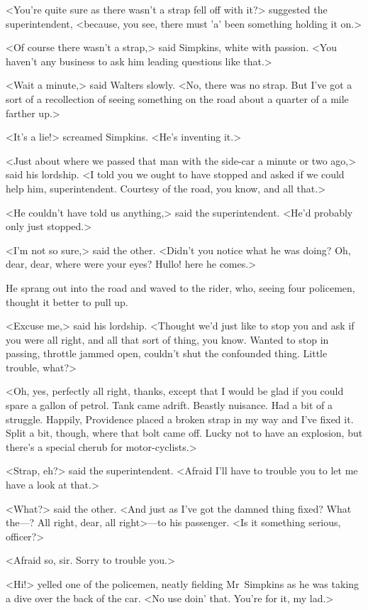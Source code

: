 <You're quite sure as there wasn't a strap fell off with it?> suggested the superintendent, <because, you see, there must 'a' been something holding it on.>

<Of course there wasn't a strap,> said Simpkins, white with passion. <You haven't any business to ask him leading questions like that.>

<Wait a minute,> said Walters slowly. <No, there was no strap. But I've got a sort of a recollection of seeing something on the road about a quarter of a mile farther up.>

<It's a lie!> screamed Simpkins. <He's inventing it.>

<Just about where we passed that man with the side-car a minute or two ago,> said his lordship. <I told you we ought to have stopped and asked if we could help him, superintendent. Courtesy of the road, you know, and all that.>

<He couldn't have told us anything,> said the superintendent. <He'd probably only just stopped.>

<I'm not so sure,> said the other. <Didn't you notice what he was doing? Oh, dear, dear, where were your eyes? Hullo! here he comes.>

He sprang out into the road and waved to the rider, who, seeing four policemen, thought it better to pull up.

<Excuse me,> said his lordship. <Thought we'd just like to stop you and ask if you were all right, and all that sort of thing, you know. Wanted to stop in passing, throttle jammed open, couldn't shut the confounded thing. Little trouble, what?>

<Oh, yes, perfectly all right, thanks, except that I would be glad if you could spare a gallon of petrol. Tank came adrift. Beastly nuisance. Had a bit of a struggle. Happily, Providence placed a broken strap in my way and I've fixed it. Split a bit, though, where that bolt came off. Lucky not to have an explosion, but there's a special cherub for motor-cyclists.>

<Strap, eh?> said the superintendent. <Afraid I'll have to trouble you to let me have a look at that.>

<What?> said the other. <And just as I've got the damned thing fixed? What the—? All right, dear, all right>—to his passenger. <Is it something serious, officer?>

<Afraid so, sir. Sorry to trouble you.>

<Hi!> yelled one of the policemen, neatly fielding Mr~Simpkins as he was taking a dive over the back of the car. <No use doin' that. You're for it, my lad.>

